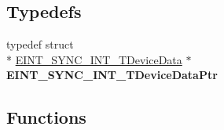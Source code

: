 \subsection*{Typedefs}
\begin{DoxyCompactItemize}
\item 
\hypertarget{group___e_i_n_t___s_y_n_c___i_n_t__module_ga5067166740fdc1294d2401e83f66ee90}{typedef struct \\*
\hyperlink{struct_e_i_n_t___s_y_n_c___i_n_t___t_device_data}{E\-I\-N\-T\-\_\-\-S\-Y\-N\-C\-\_\-\-I\-N\-T\-\_\-\-T\-Device\-Data} $\ast$ {\bfseries E\-I\-N\-T\-\_\-\-S\-Y\-N\-C\-\_\-\-I\-N\-T\-\_\-\-T\-Device\-Data\-Ptr}}\label{group___e_i_n_t___s_y_n_c___i_n_t__module_ga5067166740fdc1294d2401e83f66ee90}

\end{DoxyCompactItemize}
\subsection*{Functions}
